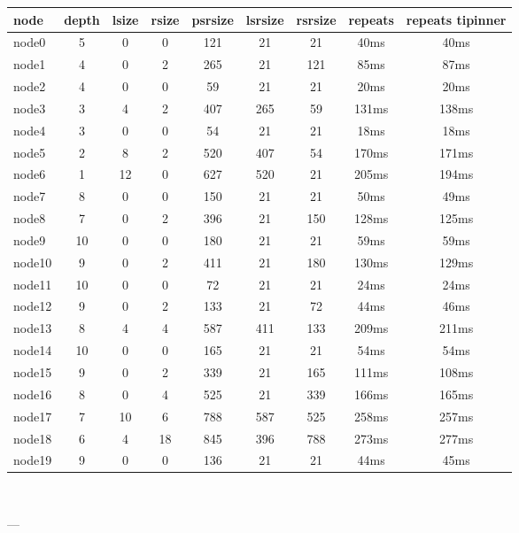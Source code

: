 

\begin{tabular}{|l|c|c|c|c|c|c|c|c|}
\hline node & depth & lsize & rsize & psrsize & lsrsize & rsrsize   & repeats & repeats tipinner\\
    \hline node0 & 5 & 0 & 0 & 121 & 21 & 21 & 40ms & 40ms\\
    \hline node1 & 4 & 0 & 2 & 265 & 21 & 121 & 85ms & 87ms\\
    \hline node2 & 4 & 0 & 0 & 59 & 21 & 21 & 20ms & 20ms\\
    \hline node3 & 3 & 4 & 2 & 407 & 265 & 59 & 131ms & 138ms\\
    \hline node4 & 3 & 0 & 0 & 54 & 21 & 21 & 18ms & 18ms\\
    \hline node5 & 2 & 8 & 2 & 520 & 407 & 54 & 170ms & 171ms\\
    \hline node6 & 1 & 12 & 0 & 627 & 520 & 21 & 205ms & 194ms\\
    \hline node7 & 8 & 0 & 0 & 150 & 21 & 21 & 50ms & 49ms\\
    \hline node8 & 7 & 0 & 2 & 396 & 21 & 150 & 128ms & 125ms\\
    \hline node9 & 10 & 0 & 0 & 180 & 21 & 21 & 59ms & 59ms\\
    \hline node10 & 9 & 0 & 2 & 411 & 21 & 180 & 130ms & 129ms\\
    \hline node11 & 10 & 0 & 0 & 72 & 21 & 21 & 24ms & 24ms\\
    \hline node12 & 9 & 0 & 2 & 133 & 21 & 72 & 44ms & 46ms\\
    \hline node13 & 8 & 4 & 4 & 587 & 411 & 133 & 209ms & 211ms\\
    \hline node14 & 10 & 0 & 0 & 165 & 21 & 21 & 54ms & 54ms\\
    \hline node15 & 9 & 0 & 2 & 339 & 21 & 165 & 111ms & 108ms\\
    \hline node16 & 8 & 0 & 4 & 525 & 21 & 339 & 166ms & 165ms\\
    \hline node17 & 7 & 10 & 6 & 788 & 587 & 525 & 258ms & 257ms\\
    \hline node18 & 6 & 4 & 18 & 845 & 396 & 788 & 273ms & 277ms\\
    \hline node19 & 9 & 0 & 0 & 136 & 21 & 21 & 44ms & 45ms\\

\hline
\end{tabular} \

---


